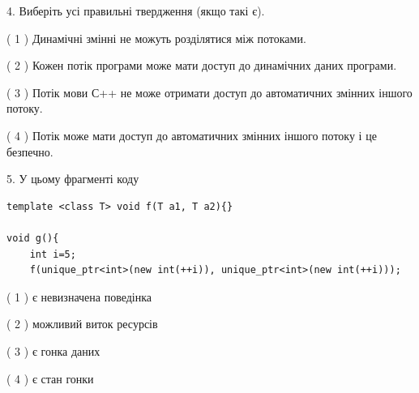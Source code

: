 \documentclass[12pt, ukrainian]{article}
\begin{document}
\begin {large}
{%
4. Виберіть усі правильні твердження (якщо такі є).\par
\vspace{2mm}

( 1 ) Динамічні змінні не можуть розділятися між потоками.%

( 2 ) Кожен потік програми може мати доступ до динамічних даних програми.%

( 3 ) Потік мови С++ не може отримати доступ до автоматичних змінних іншого потоку.%

( 4 ) Потік може мати доступ до автоматичних змінних іншого потоку і це безпечно.%


5. У цьому фрагменті коду
\begin{verbatim}
template <class T> void f(T a1, T a2){}

void g(){
    int i=5;
    f(unique_ptr<int>(new int(++i)), unique_ptr<int>(new int(++i)));
\end{verbatim}

( 1 ) є невизначена поведінка%

( 2 ) можливий виток ресурсів%

( 3 ) є гонка даних%

( 4 ) є стан гонки%
}
\end {large}
\end{document}
